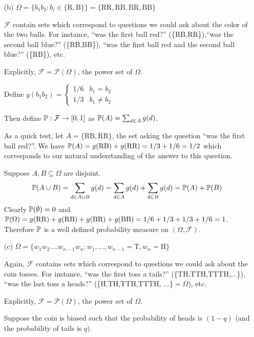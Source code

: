 \documentclass[10pt]{article}
\begin{document}
\begin{solution}[Solution]
\begin{enumerate}
    \item[(b)] 
        \( \Omega = \{b_1b_2 : b_i\in\{\text{R},\text{B}\}\} = \{\text{RR},\text{RB},\text{BR}, \text{BB}\}  \)

        \( \mathcal{F} \) contain sets which correspond to questions we could ask about the color of the two balls. For instance, ``was the first ball red?'' (\{RB,RR\}),``was the second ball blue?'' (\{RB,BB\}), ``was the first ball red and the second ball blue?'' (\{RB\}), etc.

        Explicitly, \( \mathcal{F} = \mathcal{P}(\Omega) \), the power set of \( \Omega \).

        Define \( g(b_1b_2) = \begin{cases}1/6 & b_1=b_2 \\ 1/3 & b_1\neq b_2   \end{cases} \)
        
        Then define  \( \mathbb{P}:\mathcal{F}\to[0,1] \) as \( \mathbb{P}(A) = \sum_{d\in A}g(d) \). 

        As a quick test, let \( A=\{\text{RB},\text{RR}\} \), the set asking the question ``was the first ball red?''. We have \( \mathbb{P}(A) = g(\text{RB})+g(\text{RR}) = 1/3+1/6 = 1/2 \) which corresponds to our natural understanding of the answer to this question.

        Suppose \( A,B\subseteq\Omega \) are disjoint. 
        \[ \mathbb{P}(A\cup B) = \sum_{d\in A\cup B}g(d) = \sum_{d\in A} g(d) + \sum_{d\in B} g(d) = \mathbb{P}(A)+\mathbb{P}(B) \]
        Clearly \( \mathbb{P}(\emptyset) = 0 \) and \( \mathbb{P}(\Omega) = g(\text{RR})+g(\text{RB})+g(\text{BR})+g(\text{BB}) = 1/6+1/3+1/3+1/6 = 1 \). Therefore \( \mathbb{P} \) is a well defined probability measure on \( (\Omega, \mathcal{F}) \).
        
    \item[(c)] 
        \( \Omega = \{w_1w_2....w_{n-1}w_n : w_1, ..., w_{n-1} = \text{T}, w_n=\text{H}\} \)

        Again, \( \mathcal{F} \) contains sets which correspond to questions we could ask about the coin tosses. For instance, ``was the first toss a tails?'' (\{TH,TTH,TTTH,...\}), ``was the last toss a heads?'' (\{H,TH,TTH,TTTH, ...\}\(=\Omega\)), etc.
        
        Explicitly, \( \mathcal{F} = \mathcal{P}(\Omega) \), the power set of \( \Omega \). 
        
        Suppose the coin is biased such that the probability of heads is \( (1-q) \) (and the probability of tails is \( q \)).


\end{enumerate}
\end{solution}
\end{document}
